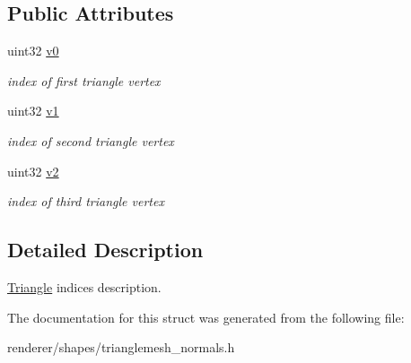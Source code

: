 \subsection*{Public Attributes}
\begin{DoxyCompactItemize}
\item 
\hypertarget{structembree_1_1_triangle_mesh_with_normals_1_1_triangle_aba597c4c5fad7329ebde8cf10f8f672c}{
uint32 \hyperlink{structembree_1_1_triangle_mesh_with_normals_1_1_triangle_aba597c4c5fad7329ebde8cf10f8f672c}{v0}}
\label{structembree_1_1_triangle_mesh_with_normals_1_1_triangle_aba597c4c5fad7329ebde8cf10f8f672c}

\begin{DoxyCompactList}\small\item\em index of first triangle vertex \item\end{DoxyCompactList}\item 
\hypertarget{structembree_1_1_triangle_mesh_with_normals_1_1_triangle_af13c04c7987e58b43ec840de74fd8cd1}{
uint32 \hyperlink{structembree_1_1_triangle_mesh_with_normals_1_1_triangle_af13c04c7987e58b43ec840de74fd8cd1}{v1}}
\label{structembree_1_1_triangle_mesh_with_normals_1_1_triangle_af13c04c7987e58b43ec840de74fd8cd1}

\begin{DoxyCompactList}\small\item\em index of second triangle vertex \item\end{DoxyCompactList}\item 
\hypertarget{structembree_1_1_triangle_mesh_with_normals_1_1_triangle_a6c856f634c23179a59a177508bfa0b19}{
uint32 \hyperlink{structembree_1_1_triangle_mesh_with_normals_1_1_triangle_a6c856f634c23179a59a177508bfa0b19}{v2}}
\label{structembree_1_1_triangle_mesh_with_normals_1_1_triangle_a6c856f634c23179a59a177508bfa0b19}

\begin{DoxyCompactList}\small\item\em index of third triangle vertex \item\end{DoxyCompactList}\end{DoxyCompactItemize}


\subsection{Detailed Description}
\hyperlink{structembree_1_1_triangle_mesh_with_normals_1_1_triangle}{Triangle} indices description. 

The documentation for this struct was generated from the following file:\begin{DoxyCompactItemize}
\item 
renderer/shapes/trianglemesh\_\-normals.h\end{DoxyCompactItemize}

